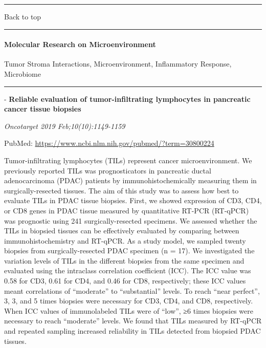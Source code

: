 \documentclass[]{article}
\let\oldparagraph\paragraph
\renewcommand{\paragraph}[1]{\oldparagraph{#1}\mbox{}}
\begin{document}
{}

{}

\begin{center}\rule{0.5\linewidth}{\linethickness}\end{center}

Back to top

\begin{center}\rule{0.5\linewidth}{\linethickness}\end{center}

\pagebreak

\hypertarget{molecular-research-on-microenvironment}{%
\paragraph{Molecular Research on
Microenvironment}\label{molecular-research-on-microenvironment}}

Tumor Stroma Interactions, Microenvironment, Inflammatory Response,
Microbiome

\begin{center}\rule{0.5\linewidth}{\linethickness}\end{center}

 - \textbf{Reliable evaluation of tumor-infiltrating lymphocytes in
pancreatic cancer tissue biopsies}

\emph{Oncotarget 2019 Feb;10(10):1149-1159}

PubMed: \url{https://www.ncbi.nlm.nih.gov/pubmed/?term=30800224}

Tumor-infiltrating lymphocytes (TILs) represent cancer microenvironment.
We previously reported TILs was prognosticators in pancreatic ductal
adenocarcinoma (PDAC) patients by immunohistochemically measuring them
in surgically-resected tissues. The aim of this study was to assess how
best to evaluate TILs in PDAC tissue biopsies. First, we showed
expression of CD3, CD4, or CD8 genes in PDAC tissue measured by
quantitative RT-PCR (RT-qPCR) was prognostic using 241
surgically-resected specimens. We assessed whether the TILs in biopsied
tissues can be effectively evaluated by comparing between
immunohistochemistry and RT-qPCR. As a study model, we sampled twenty
biopsies from surgically-resected PDAC specimen (n = 17). We
investigated the variation levels of TILs in the different biopsies from
the same specimen and evaluated using the intraclass correlation
coefficient (ICC). The ICC value was 0.58 for CD3, 0.61 for CD4, and
0.46 for CD8, respectively; these ICC values meant correlations of
``moderate'' to ``substantial'' levels. To reach ``near perfect'', 3, 3,
and 5 times biopsies were necessary for CD3, CD4, and CD8, respectively.
When ICC values of immunolabeled TILs were of ``low'', ≥6 times biopsies
were necessary to reach ``moderate'' levels. We found that TILs measured
by RT-qPCR and repeated sampling increased reliability in TILs detected
from biopsied PDAC tissues.
\end{document}
